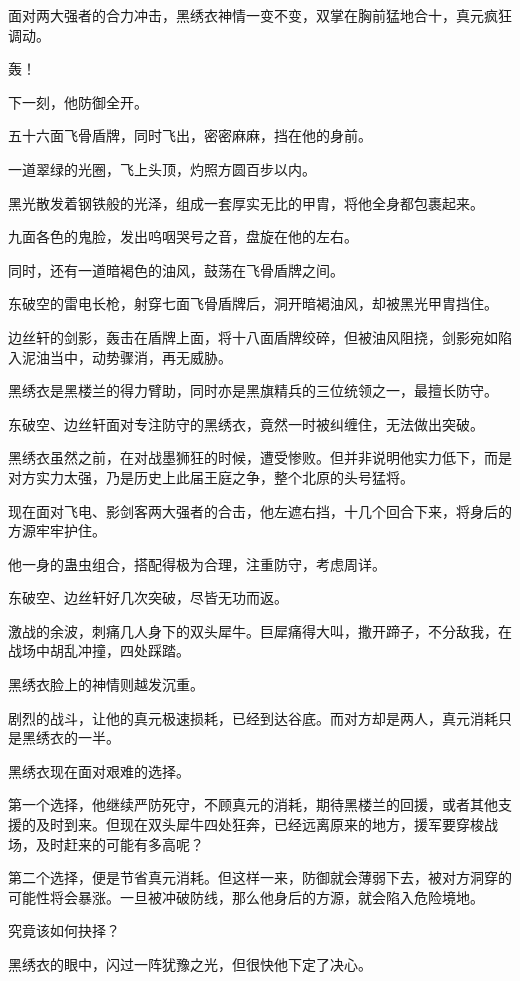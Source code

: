 \begin{this_body}
面对两大强者的合力冲击，黑绣衣神情一变不变，双掌在胸前猛地合十，真元疯狂调动。

轰！

下一刻，他防御全开。

五十六面飞骨盾牌，同时飞出，密密麻麻，挡在他的身前。

一道翠绿的光圈，飞上头顶，灼照方圆百步以内。

黑光散发着钢铁般的光泽，组成一套厚实无比的甲胄，将他全身都包裹起来。

九面各色的鬼脸，发出呜咽哭号之音，盘旋在他的左右。

同时，还有一道暗褐色的油风，鼓荡在飞骨盾牌之间。

东破空的雷电长枪，射穿七面飞骨盾牌后，洞开暗褐油风，却被黑光甲胄挡住。

边丝轩的剑影，轰击在盾牌上面，将十八面盾牌绞碎，但被油风阻挠，剑影宛如陷入泥油当中，动势骤消，再无威胁。

黑绣衣是黑楼兰的得力臂助，同时亦是黑旗精兵的三位统领之一，最擅长防守。

东破空、边丝轩面对专注防守的黑绣衣，竟然一时被纠缠住，无法做出突破。

黑绣衣虽然之前，在对战墨狮狂的时候，遭受惨败。但并非说明他实力低下，而是对方实力太强，乃是历史上此届王庭之争，整个北原的头号猛将。

现在面对飞电、影剑客两大强者的合击，他左遮右挡，十几个回合下来，将身后的方源牢牢护住。

他一身的蛊虫组合，搭配得极为合理，注重防守，考虑周详。

东破空、边丝轩好几次突破，尽皆无功而返。

激战的余波，刺痛几人身下的双头犀牛。巨犀痛得大叫，撒开蹄子，不分敌我，在战场中胡乱冲撞，四处踩踏。

黑绣衣脸上的神情则越发沉重。

剧烈的战斗，让他的真元极速损耗，已经到达谷底。而对方却是两人，真元消耗只是黑绣衣的一半。

黑绣衣现在面对艰难的选择。

第一个选择，他继续严防死守，不顾真元的消耗，期待黑楼兰的回援，或者其他支援的及时到来。但现在双头犀牛四处狂奔，已经远离原来的地方，援军要穿梭战场，及时赶来的可能有多高呢？

第二个选择，便是节省真元消耗。但这样一来，防御就会薄弱下去，被对方洞穿的可能性将会暴涨。一旦被冲破防线，那么他身后的方源，就会陷入危险境地。

究竟该如何抉择？

黑绣衣的眼中，闪过一阵犹豫之光，但很快他下定了决心。


\end{this_body}
